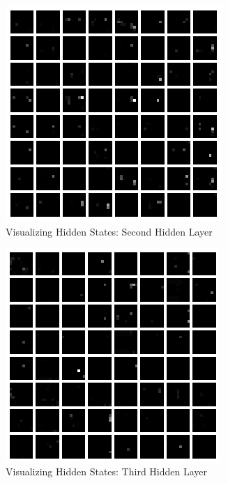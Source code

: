 \documentclass[10pt,twocolumn,letterpaper]{article}
\begin{document}
\begin{figure}[H]
\center
\includegraphics[width=\columnwidth]{layer2}
\caption{
Visualizing Hidden States: Second Hidden Layer
}\label{fig:layer2}
\end{figure}

\begin{figure}[H]
\center
\includegraphics[width=\columnwidth]{layer3}
\caption{
Visualizing Hidden States: Third Hidden Layer
}\label{fig:layer3}
\end{figure}
\end{document}
